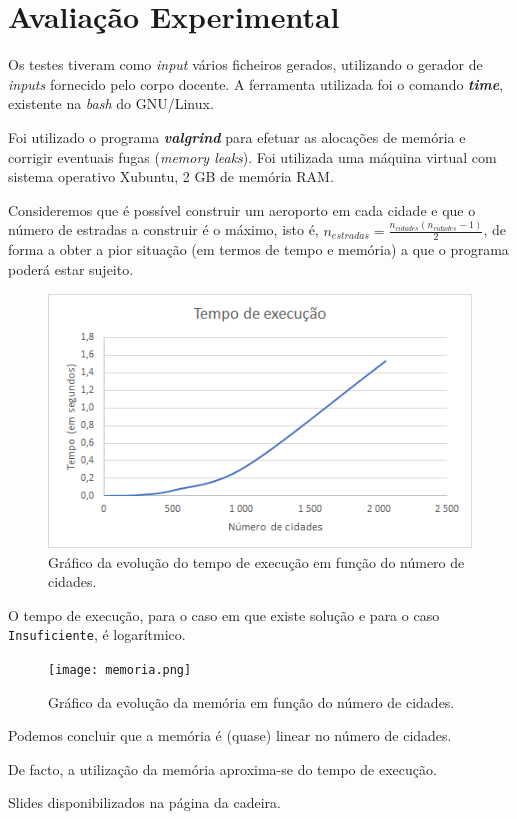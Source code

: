 \documentclass[12pt]{article}
\begin{document}
\section*{Avaliação Experimental}
Os testes tiveram como \textit{input} vários ficheiros gerados, utilizando o gerador de \textit{inputs} fornecido pelo corpo docente. 
A ferramenta utilizada foi o comando \textbf{\textit{time}}, existente na \textit{bash} do GNU/Linux.

Foi utilizado o programa \textbf{\textit{valgrind}} para efetuar as alocações de memória e corrigir eventuais fugas (\textit{memory leaks}). Foi utilizada uma máquina virtual com sistema operativo Xubuntu, 2 GB de memória RAM.

Consideremos que é possível construir um aeroporto em cada cidade e que o número de estradas a construir é o máximo, isto é, $ n_{estradas} = \frac{n_{cidades}(n_{cidades} - 1)}{2}$, de forma a obter a pior situação (em termos de tempo e memória) a que o programa poderá estar sujeito.

\begin{figure}[h]
	\includegraphics{tempo.png}
	\caption{Gráfico da evolução do tempo de execução em função do número de cidades.}
\end{figure}

\newpage

O tempo de execução, para o caso em que existe solução e para o caso \texttt{Insuficiente}, é logarítmico.

\begin{figure}[h]
	\texttt{[image: memoria.png]}
	\caption{Gráfico da evolução da memória em função do número de cidades.}
\end{figure}

Podemos concluir que a memória é (quase) linear no número de cidades.

De facto, a utilização da memória aproxima-se do tempo de execução.

\begin{thebibliography}{9}

Slides disponibilizados na página da cadeira.

\end{thebibliography}
\end{document}
